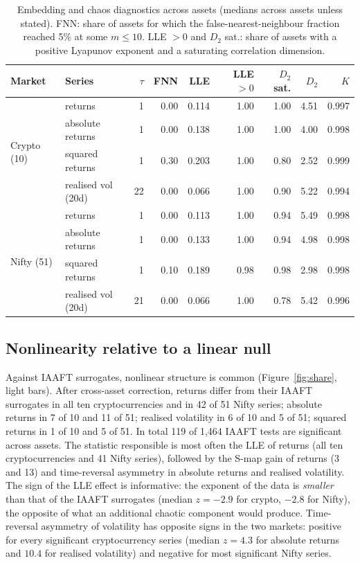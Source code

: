\documentclass[11pt,a4paper]{article}
\begin{document}
\begin{table}[t]
\centering
\small
\caption{Embedding and chaos diagnostics across assets (medians across assets unless stated). FNN: share of assets for
which the false-nearest-neighbour fraction reached 5\% at some $m\le 10$. LLE $>0$ and $D_2$ sat.: share of assets with
a positive Lyapunov exponent and a saturating correlation dimension.}
\label{tab:diag}
\begin{tabular}{llrrrrrrr}
\toprule
Market & Series & $\tau$ & FNN & LLE & LLE $>0$ & $D_2$ sat. & $D_2$ & $K$ \\
\midrule
\multirow{4}{*}{Crypto (10)} & returns & 1 & 0.00 & 0.114 & 1.00 & 1.00 & 4.51 & 0.997\\
 & absolute returns & 1 & 0.00 & 0.138 & 1.00 & 1.00 & 4.00 & 0.998\\
 & squared returns & 1 & 0.30 & 0.203 & 1.00 & 0.80 & 2.52 & 0.999\\
 & realised vol (20d) & 22 & 0.00 & 0.066 & 1.00 & 0.90 & 5.22 & 0.994\\
\midrule
\multirow{4}{*}{Nifty (51)} & returns & 1 & 0.00 & 0.113 & 1.00 & 0.94 & 5.49 & 0.998\\
 & absolute returns & 1 & 0.00 & 0.133 & 1.00 & 0.94 & 4.98 & 0.998\\
 & squared returns & 1 & 0.10 & 0.189 & 0.98 & 0.98 & 2.98 & 0.998\\
 & realised vol (20d) & 21 & 0.00 & 0.066 & 1.00 & 0.78 & 5.42 & 0.996\\
\bottomrule
\end{tabular}
\end{table}

\subsection{Nonlinearity relative to a linear null}

Against IAAFT surrogates, nonlinear structure is common (Figure~\ref{fig:share}, light bars). After cross-asset
correction, returns differ from their IAAFT surrogates in all ten cryptocurrencies and in 42 of 51 Nifty series;
absolute returns in 7 of 10 and 11 of 51; realised volatility in 6 of 10 and 5 of 51; squared returns in 1 of 10 and 5
of 51. In total 119 of 1,464 IAAFT tests are significant across assets. The statistic responsible is most often the
LLE of returns (all ten cryptocurrencies and 41 Nifty series), followed by the S-map gain of returns (3 and 13) and
time-reversal asymmetry in absolute returns and realised volatility. The sign of the LLE effect is informative: the
exponent of the data is \emph{smaller} than that of the IAAFT surrogates (median $z=-2.9$ for crypto, $-2.8$ for
Nifty), the opposite of what an additional chaotic component would produce. Time-reversal asymmetry of volatility has
opposite signs in the two markets: positive for every significant cryptocurrency series (median $z=4.3$ for absolute
returns and $10.4$ for realised volatility) and negative for most significant Nifty series.
\end{document}
